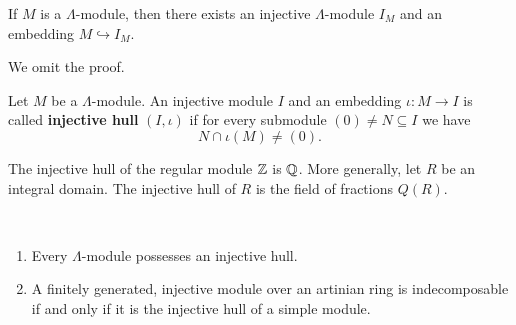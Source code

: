 
\begin{theorem}
If $M$ is a $\Lambda$-module, then there exists an injective $\Lambda$-module $I_M$ and an embedding $M\hookrightarrow I_M$.
\end{theorem}


We omit the proof.


\begin{definition}
Let $M$ be a $\Lambda$-module. An injective module $I$ and an embedding $\iota:M\to I$ is called \textbf{injective hull} $(I,\iota)$ if for every submodule $(0)\neq N\subseteq I$ we have
\[
N\cap \iota (M)\neq (0).
\]
\end{definition}


\begin{example}
The injective hull of the regular module $\mathbb{Z}$ is $\mathbb{Q}$. More generally, let $R$ be an integral domain. The injective hull of $R$ is the field of fractions $Q(R)$.
\end{example}


\begin{theorem}\label{1.5.2}\
\begin{enumerate}
\item Every $\Lambda$-module possesses an injective hull.
\item A finitely generated, injective module over an artinian ring is indecomposable if and only if it is the injective hull of a simple module.
\end{enumerate}
\end{theorem}


